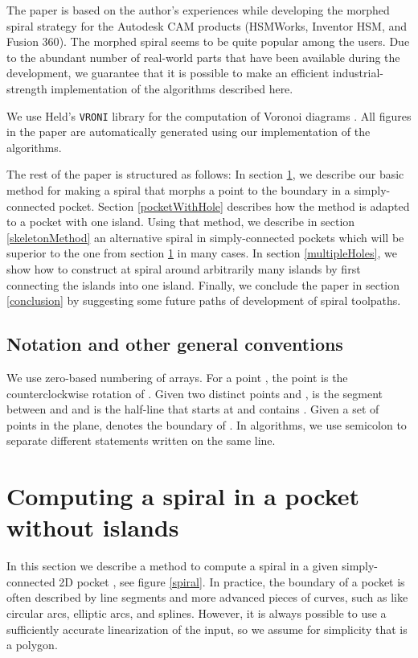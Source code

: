\documentclass[3p]{elsarticle}
\begin{document}
The paper is based on the author's experiences while developing the morphed spiral strategy for the
Autodesk\texttrademark{} CAM products (HSMWorks,
Inventor HSM\textsuperscript{\textregistered}, and Fusion 360\textsuperscript{\textregistered}).
The morphed spiral seems to be quite popular among the users.
Due to the abundant number of real-world parts that have been available during the development,
we guarantee that it is possible
to make an efficient industrial-strength implementation of the algorithms described here.

We use Held's \texttt{VRONI} library for the computation of Voronoi diagrams \cite{held2001}.
All figures in the paper are automatically generated using our implementation of the algorithms.

The rest of the paper is structured as follows:
In section \ref{withoutHoles}, we describe our basic method for making a spiral
that morphs a point to the boundary in a simply-connected pocket.
Section \ref{pocketWithHole} describes how the method is adapted to a pocket with one island.
Using that method, we describe in section \ref{skeletonMethod} an alternative spiral in simply-connected pockets which will be superior to the one from section \ref{withoutHoles} in many cases.
In section \ref{multipleHoles}, we show how to construct at spiral
around arbitrarily many islands by first connecting the islands into one island.
Finally, we conclude the paper in section \ref{conclusion}
by suggesting some future paths of development of spiral
toolpaths.

\subsection{Notation and other general conventions}
We use zero-based numbering of arrays.
For a point , the point  is the counterclockwise rotation of .
Given two distinct points  and ,  is the segment between  and 
and  is the half-line that starts at  and contains .
Given a set of points  in the plane,  denotes the boundary of .
In algorithms, we
use semicolon to separate different statements written on the same line.

\section{Computing a spiral in a pocket without islands}\label{withoutHoles}

In this section we describe a method to compute a spiral in a given simply-connected
2D pocket , see figure \ref{spiral}.
In practice, the boundary of a pocket is often described by line segments and more advanced pieces of
curves, such as like circular arcs, elliptic arcs, and splines.
However, it is always possible to use a sufficiently accurate linearization of the input,
so we assume for simplicity that  is a polygon.
\end{document}
